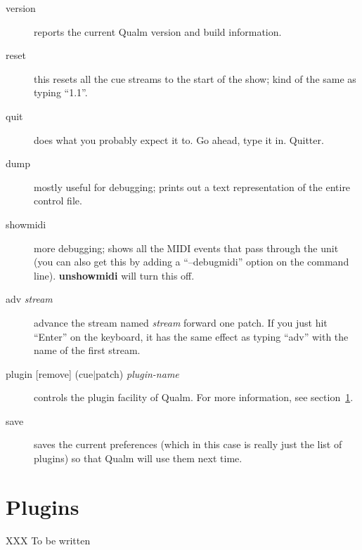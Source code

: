 \documentclass{article}
\newcommand{\q}{{\textsf{Qualm}}\xspace}
\begin{document}
\begin{description}
\item[version] reports the current \q version and build
      information.

\item[reset] this resets all the cue streams to the start of the
      show; kind of the same as typing ``1.1''.

\item[quit] does what you probably expect it to.  Go ahead, type it
      in.  Quitter.

\item[dump] mostly useful for debugging; prints out a text
      representation of the entire control file.

\item[showmidi] more debugging; shows all the MIDI events that pass
      through the unit (you can also get this by adding a ``--debugmidi''
      option on the command line).  {\bf unshowmidi} will turn this
      off.

\item[adv \textit{stream}] advance the stream named {\em stream}
      forward one patch.  If you just hit ``Enter'' on the keyboard,
      it has the same effect as typing ``adv'' with the name of the
      first stream.

\item[plugin {[remove]} (cue$\mid$patch) \textit{plugin-name}] controls
      the plugin facility of \q.  For more information, see
      section~\ref{sec:plugins}.

\item[save] saves the current preferences (which in this case is
      really just the list of plugins) so that \q will use them next
      time.
\end{description}

\begin{latexonly}
\newpage
\end{latexonly}
\section{Plugins}
\label{sec:plugins}
XXX To be written


\newpage
\printindex
\end{document}
